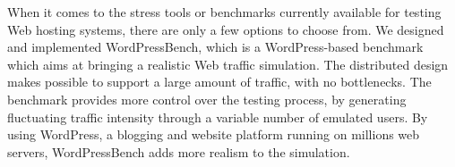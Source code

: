 
When it comes to the stress tools or benchmarks currently available for testing Web hosting systems, there are only a few options to choose from. We designed and implemented WordPressBench, which is a WordPress-based benchmark which aims at bringing a realistic Web  traffic simulation. The distributed design makes possible to support a large amount of traffic, with no bottlenecks. The benchmark provides more control over the testing process, by generating fluctuating traffic intensity through a variable number of emulated users. By using WordPress, a blogging and website platform running on millions web servers, WordPressBench adds more realism to the simulation.
